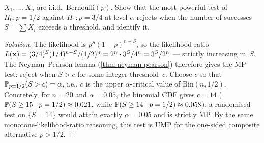 \begin{problem}
\label{prob:bernoulli-test}
$X_1, \dots, X_n$ are i.i.d.\ $\mathrm{Bernoulli}(p)$. Show that
the most powerful test of $H_0 : p = 1/2$ against $H_1 : p = 3/4$
at level $\alpha$ rejects when the number of successes $S = \sum X_i$
exceeds a threshold, and identify it.
\end{problem}

\begin{proof}[Solution]
The likelihood is $p^S (1 - p)^{n - S}$, so the likelihood ratio
$L(\mathbf{x}) = (3/4)^S (1/4)^{n - S} / (1/2)^n = 2^n \cdot 3^S / 4^n = 3^S / 2^n$ —
strictly increasing in~$S$. The Neyman--Pearson lemma
(\cref{thm:neyman-pearson}) therefore gives the MP test: reject
when $S > c$ for some integer threshold~$c$. Choose $c$ so that
$\mathbb{P}_{p = 1/2}(S > c) = \alpha$, i.e., $c$ is the upper
$\alpha$-critical value of $\mathrm{Bin}(n, 1/2)$. Concretely, for
$n = 20$ and $\alpha = 0.05$, the binomial CDF gives $c = 14$
($\mathbb{P}(S \geq 15 \mid p = 1/2) \approx 0.021$, while
$\mathbb{P}(S \geq 14 \mid p = 1/2) \approx 0.058$); a randomised test
on $\{S = 14\}$ would attain exactly $\alpha = 0.05$ and is
strictly MP. By the same monotone-likelihood-ratio reasoning, this
test is UMP for the one-sided composite alternative $p > 1/2$.
\end{proof}
